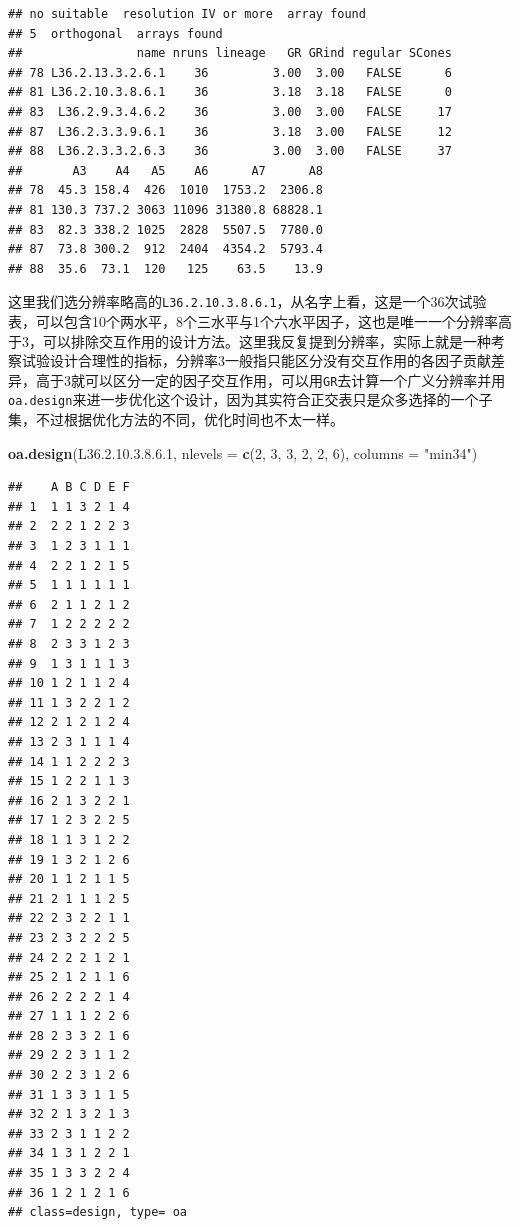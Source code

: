 \documentclass[]{tufte-book}
\newenvironment{Shaded}{}{}
\newcommand{\DataTypeTok}[1]{\textcolor[rgb]{0.56,0.13,0.00}{#1}}
\newcommand{\DecValTok}[1]{\textcolor[rgb]{0.25,0.63,0.44}{#1}}
\newcommand{\FloatTok}[1]{\textcolor[rgb]{0.25,0.63,0.44}{#1}}
\newcommand{\KeywordTok}[1]{\textcolor[rgb]{0.00,0.44,0.13}{\textbf{#1}}}
\newcommand{\NormalTok}[1]{#1}
\newcommand{\StringTok}[1]{\textcolor[rgb]{0.25,0.44,0.63}{#1}}
\begin{document}
\begin{verbatim}
## no suitable  resolution IV or more  array found
## 5  orthogonal  arrays found
##                name nruns lineage   GR GRind regular SCones
## 78 L36.2.13.3.2.6.1    36         3.00  3.00   FALSE      6
## 81 L36.2.10.3.8.6.1    36         3.18  3.18   FALSE      0
## 83  L36.2.9.3.4.6.2    36         3.00  3.00   FALSE     17
## 87  L36.2.3.3.9.6.1    36         3.18  3.00   FALSE     12
## 88  L36.2.3.3.2.6.3    36         3.00  3.00   FALSE     37
##       A3    A4   A5    A6      A7      A8
## 78  45.3 158.4  426  1010  1753.2  2306.8
## 81 130.3 737.2 3063 11096 31380.8 68828.1
## 83  82.3 338.2 1025  2828  5507.5  7780.0
## 87  73.8 300.2  912  2404  4354.2  5793.4
## 88  35.6  73.1  120   125    63.5    13.9
\end{verbatim}

这里我们选分辨率略高的\texttt{L36.2.10.3.8.6.1}，从名字上看，这是一个36次试验表，可以包含10个两水平，8个三水平与1个六水平因子，这也是唯一一个分辨率高于3，可以排除交互作用的设计方法。这里我反复提到分辨率，实际上就是一种考察试验设计合理性的指标，分辨率3一般指只能区分没有交互作用的各因子贡献差异，高于3就可以区分一定的因子交互作用，可以用\texttt{GR}去计算一个广义分辨率并用\texttt{oa.design}来进一步优化这个设计，因为其实符合正交表只是众多选择的一个子集，不过根据优化方法的不同，优化时间也不太一样。

\begin{Shaded}
\begin{Highlighting}[]
\KeywordTok{oa.design}\NormalTok{(L36.}\DecValTok{2}\NormalTok{.}\DecValTok{10}\NormalTok{.}\DecValTok{3}\NormalTok{.}\DecValTok{8}\NormalTok{.}\FloatTok{6.1}\NormalTok{, }\DataTypeTok{nlevels =} \KeywordTok{c}\NormalTok{(}\DecValTok{2}\NormalTok{, }\DecValTok{3}\NormalTok{, }\DecValTok{3}\NormalTok{, }\DecValTok{2}\NormalTok{, }\DecValTok{2}\NormalTok{, }\DecValTok{6}\NormalTok{), }\DataTypeTok{columns =} \StringTok{"min34"}\NormalTok{)}
\end{Highlighting}
\end{Shaded}

\begin{verbatim}
##    A B C D E F
## 1  1 1 3 2 1 4
## 2  2 2 1 2 2 3
## 3  1 2 3 1 1 1
## 4  2 2 1 2 1 5
## 5  1 1 1 1 1 1
## 6  2 1 1 2 1 2
## 7  1 2 2 2 2 2
## 8  2 3 3 1 2 3
## 9  1 3 1 1 1 3
## 10 1 2 1 1 2 4
## 11 1 3 2 2 1 2
## 12 2 1 2 1 2 4
## 13 2 3 1 1 1 4
## 14 1 1 2 2 2 3
## 15 1 2 2 1 1 3
## 16 2 1 3 2 2 1
## 17 1 2 3 2 2 5
## 18 1 1 3 1 2 2
## 19 1 3 2 1 2 6
## 20 1 1 2 1 1 5
## 21 2 1 1 1 2 5
## 22 2 3 2 2 1 1
## 23 2 3 2 2 2 5
## 24 2 2 2 1 2 1
## 25 2 1 2 1 1 6
## 26 2 2 2 2 1 4
## 27 1 1 1 2 2 6
## 28 2 3 3 2 1 6
## 29 2 2 3 1 1 2
## 30 2 2 3 1 2 6
## 31 1 3 3 1 1 5
## 32 2 1 3 2 1 3
## 33 2 3 1 1 2 2
## 34 1 3 1 2 2 1
## 35 1 3 3 2 2 4
## 36 1 2 1 2 1 6
## class=design, type= oa
\end{verbatim}
\end{document}
